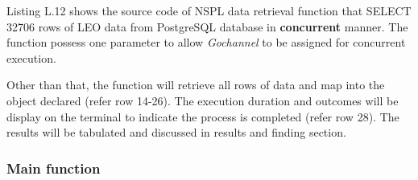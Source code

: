 Listing L.12 shows the source code of NSPL data retrieval function that SELECT 32706 rows of LEO data from PostgreSQL database in \textbf{concurrent} manner. The function possess one parameter to allow \textit{Gochannel} to be assigned for concurrent execution. 

Other than that, the function will retrieve all rows of data and map into the object declared (refer row 14-26). The execution duration and outcomes will be display on the terminal to indicate the process is completed (refer row 28). The results will be tabulated and discussed in results and finding section. 

\newpage

\subsubsection{Main function}

